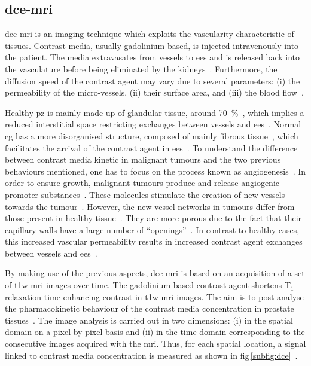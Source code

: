 \subsection{\acs*{dce}-\acs*{mri}}\label{subsec:chp2:imaging:dce}
\ac{dce}-\ac{mri} is an imaging technique which exploits the vascularity characteristic of tissues.
Contrast media, usually gadolinium-based, is injected intravenously into the patient.
The media extravasates from vessels to \ac{ees} and is released back into the vasculature before being eliminated by the kidneys~\cite{Gribbestad2005}.
Furthermore, the diffusion speed of the contrast agent may vary due to several parameters: (i) the permeability of the micro-vessels, (ii) their surface area, and (iii) the blood flow~\cite{Padhani2002}.

Healthy \ac{pz} is mainly made up of glandular tissue, around \SI{70}{\percent}~\cite{Choi2007}, which implies a reduced interstitial space restricting exchanges between vessels and \ac{ees}~\cite{Buckley2004,Niekerk2009}.
Normal \ac{cg} has a more disorganised structure, composed of mainly fibrous tissue~\cite{Choi2007,Hoeks2011}, which facilitates the arrival of the contrast agent in \ac{ees}~\cite{Niekerk2013}.
To understand the difference between contrast media kinetic in malignant tumours and the two previous behaviours mentioned, one has to focus on the process known as angiogenesis~\cite{Carmeliet2000}.
In order to ensure growth, malignant tumours produce and release angiogenic promoter substances~\cite{Carmeliet2000}.
These molecules stimulate the creation of new vessels towards the tumour~\cite{Carmeliet2000}.
However, the new vessel networks in tumours differ from those present in healthy tissue~\cite{Gribbestad2005}.
They are more porous due to the fact that their capillary walls have a large number of ``openings''~\cite{Gribbestad2005,Choi2007}.
In contrast to healthy cases, this increased vascular permeability results in increased contrast agent exchanges between vessels and \ac{ees}~\cite{Verma2012}.

By making use of the previous aspects, \ac{dce}-\ac{mri} is based on an acquisition of a set of \ac{t1w}-\ac{mri} images over time.
The gadolinium-based contrast agent shortens T$_1$ relaxation time enhancing contrast in \ac{t1w}-\ac{mri} images.
The aim is to post-analyse the pharmacokinetic behaviour of the contrast media concentration in prostate tissues~\cite{Verma2012}.
The image analysis is carried out in two dimensions: (i) in the spatial domain on a pixel-by-pixel basis and (ii) in the time domain corresponding to the consecutive images acquired with the \ac{mri}.
Thus, for each spatial location, a signal linked to contrast media concentration is measured as shown in \acs{fig}\,\ref{subfig:dce}~\cite{Tofts2010}. 

